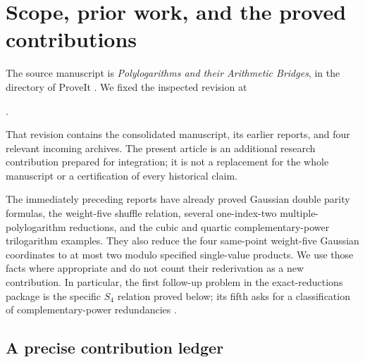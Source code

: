 \section{Scope, prior work, and the proved contributions}
\label{sec:scope}

The source manuscript is \emph{Polylogarithms and their Arithmetic
Bridges}, in the directory
 of ProveIt
\cite{repoManuscript}. We fixed the inspected revision at
\begin{center}
\small{}.
\end{center}
That revision contains the consolidated manuscript, its earlier reports,
and four relevant incoming archives. The present article is an additional
research contribution prepared for integration; it is not a replacement
for the whole manuscript or a certification of every historical claim.

The immediately preceding reports have already proved Gaussian double
parity formulas, the weight-five shuffle relation, several one-index-two
multiple-polylogarithm reductions, and the cubic and quartic
complementary-power trilogarithm examples. They also reduce the four
same-point weight-five Gaussian coordinates to at most two modulo
specified single-value products. We use those facts where appropriate
and do not count their rederivation as a new contribution. In particular,
the first follow-up problem in the exact-reductions package is the
specific $S_4$ relation proved below; its fifth asks for a classification
of complementary-power redundancies \cite{repoExact}.

\subsection{A precise contribution ledger}

